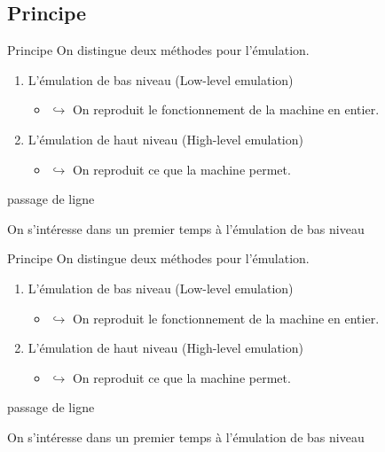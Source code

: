 \documentclass{beamer}
\begin{document}
    \subsection{Principe}
    \begin{frame}{Principe}
        On distingue deux méthodes pour l'émulation.
        \begin{enumerate}
            \item[\color{white}] \color{white} L'émulation de bas niveau (Low-level emulation)
            \begin{itemize}
                \item[\color{white}] \color{white} $\hookrightarrow$ On reproduit le fonctionnement de la machine en entier.
            \end{itemize}
            \item[\color{white}] \color{white} L'émulation de haut niveau (High-level emulation)
            \begin{itemize}
                \item[\color{white}] \color{white} $\hookrightarrow$ On reproduit ce que la machine permet.
            \end{itemize}
        \end{enumerate}
        {\color{white} passage de ligne}

        \color{white} On s'intéresse dans un premier temps à l'émulation de bas niveau
    \end{frame}

    \begin{frame}{Principe}
        On distingue deux méthodes pour l'émulation.
        \begin{enumerate}
            \item L'émulation de bas niveau (Low-level emulation)
            \begin{itemize}
                \item[\color{white}] $\hookrightarrow$ On reproduit le fonctionnement de la machine en entier.
            \end{itemize}
            \item[\color{white}] \color{white} L'émulation de haut niveau (High-level emulation)
            \begin{itemize}
                \item[\color{white}] \color{white} $\hookrightarrow$ On reproduit ce que la machine permet.
            \end{itemize}
        \end{enumerate}
        {\color{white} passage de ligne}
        
        \color{white} On s'intéresse dans un premier temps à l'émulation de bas niveau
    \end{frame}
\end{document}
